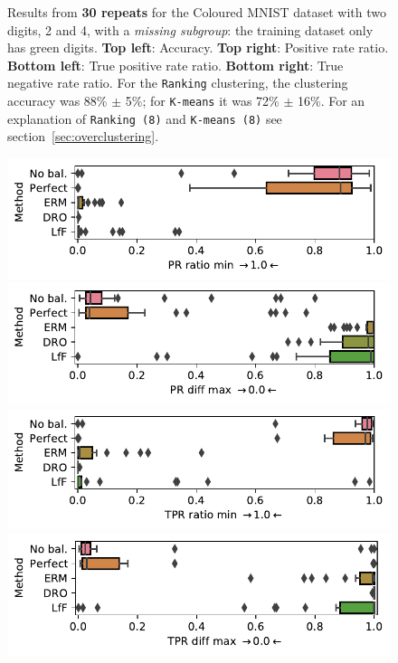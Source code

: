 \begin{figure}[htp]
  \caption{
    Results from \textbf{30 repeats} for the Coloured MNIST dataset with two digits, 2 and 4, with a \emph{missing subgroup}: the training dataset only has {\color{green}green} digits.
    \textbf{Top left}: Accuracy.
    \textbf{Top right}: Positive rate ratio.
    \textbf{Bottom left}: True positive rate ratio.
    \textbf{Bottom right}: True negative rate ratio.
    For the \texttt{Ranking} clustering, the clustering accuracy was 88\% $\pm$ 5\%;
    for \texttt{K-means} it was 72\% $\pm$ 16\%.
    For an explanation of \texttt{Ranking (8)} and \texttt{K-means (8)} see section~\ref{sec:overclustering}.
  }%
  \label{fig:cmnist-2v4-miss-s-add}
\end{figure}
\begin{figure}[htp]
  \centering
  \includegraphics[width=\columnwidth]{figures/cmnist_3dig_4miss_prr-min.pdf}
  \includegraphics[width=\columnwidth]{figures/cmnist_3dig_4miss_prd-max.pdf}
  \includegraphics[width=\columnwidth]{figures/cmnist_3dig_4miss_tprr-min.pdf}
  \includegraphics[width=\columnwidth]{figures/cmnist_3dig_4miss_tprd-max.pdf}

\end{figure}
